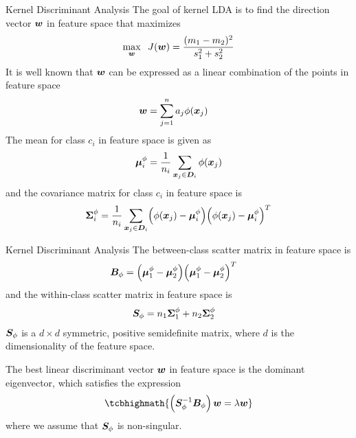 \ifdefined\wox \begin{frame} \titlepage \end{frame} \fi
 
\begin{frame}{Kernel Discriminant Analysis} 
The goal of kernel LDA is to f\/{i}nd the direction vector ${\boldsymbol w}$ in
feature space that maximizes
\begin{align*}
        \max_{{\boldsymbol w}} \;\; J({\boldsymbol w}) = \frac{(m_1 - m_2)^2}{s_1^2 + s_2^2}
\end{align*}
It is well known that 
${\boldsymbol w}$ can be expressed as a linear combination of the
points in feature space
\begin{align*}
  {\boldsymbol w} 
  & = \sum_{j=1}^n a_{j} \phi({\boldsymbol x}_{j})
\end{align*}
The mean for class $c_i$ in feature space is given as
\begin{align*}
{\bm \mu}^\phi_i = {1 \over n_i} \sum_{{\boldsymbol x}_{j} \in {\boldsymbol D}_i} \phi({\boldsymbol x}_{j})
\end{align*}
and the covariance matrix for class $c_i$ in feature space is
\begin{align*}
  {\bm \Sigma}_i^\phi = {1 \over n_i} \sum_{{\boldsymbol x}_{j} \in {\boldsymbol D}_i}
  \Bigl(\phi({\boldsymbol x}_{j}) - {\bm \mu}_i^\phi\Bigr)
  \Bigl(\phi({\boldsymbol x}_{j})- {\bm \mu}_i^\phi\Bigr)^T
\end{align*}
\end{frame}



\begin{frame}{Kernel Discriminant Analysis} 
The between-class scatter matrix in feature space is
\begin{align*}
  {\boldsymbol B}_\phi & = \Bigl({\bm \mu}_1^\phi - {\bm \mu}_2^\phi\Bigr)
  \Bigl({\bm \mu}_1^\phi - {\bm \mu}_2^\phi\Bigr)^T
\end{align*}
and the within-class scatter matrix in feature space is
\begin{align*}
  {\boldsymbol S}_\phi &= n_1{\bm \Sigma}_1^\phi + n_2{\bm \Sigma}_2^\phi
\end{align*}
${\boldsymbol S}_\phi$ is a $d \times d$ symmetric, positive semidef\/{i}nite
matrix, where $d$ is the dimensionality of the feature space. 

\medskip
The best linear
discriminant vector ${\boldsymbol w}$ in feature space is the dominant
eigenvector, which satisf\/{i}es the expression
\begin{align*}
\tcbhighmath{
  \lB(\bS_\phi^{-1}\bB_\phi\rB) \bw = \lambda \bw
}
 \label{eq:class:lda:eigeqF}
\end{align*}
where we assume that ${\boldsymbol S}_\phi$ is non-singular. 
\end{frame}


